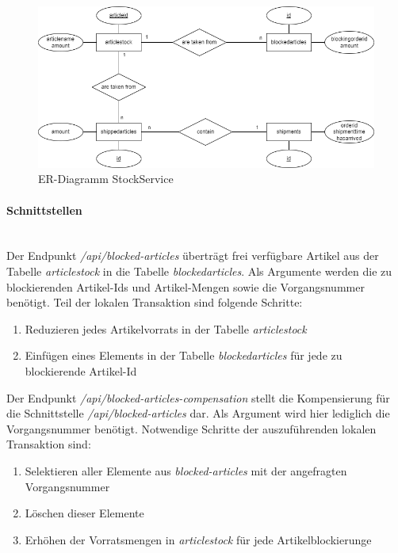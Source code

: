 \begin{figure}[h!]
	\centering
	\includegraphics[scale=0.5]{figures/DatabaseER/StockServiceTables.png}
	\caption{ER-Diagramm StockService}
\end{figure}
\FloatBarrier

\paragraph*{Schnittstellen} \mbox{}\\

Der Endpunkt \textit{/api/blocked-articles} überträgt frei verfügbare Artikel aus der Tabelle \textit{articlestock} in die Tabelle \textit{blockedarticles}. Als Argumente werden die zu blockierenden Artikel-Ids und Artikel-Mengen sowie die Vorgangsnummer benötigt. Teil der lokalen Transaktion sind folgende Schritte:
\begin{enumerate}
	\item Reduzieren jedes Artikelvorrats in der Tabelle \textit{articlestock}
	\item Einfügen eines Elements in der Tabelle \textit{blockedarticles} für jede zu blockierende Artikel-Id
\end{enumerate}

Der Endpunkt \textit{/api/blocked-articles-compensation} stellt die Kompensierung für die Schnittstelle \textit{/api/blocked-articles} dar. Als Argument wird hier lediglich die Vorgangsnummer benötigt. Notwendige Schritte der auszuführenden lokalen Transaktion sind:
\begin{enumerate}
	\item Selektieren aller Elemente aus \textit{blocked-articles} mit der angefragten Vorgangsnummer
	\item Löschen dieser Elemente
	\item Erhöhen der Vorratsmengen in \textit{articlestock} für jede Artikelblockierunge
\end{enumerate}

